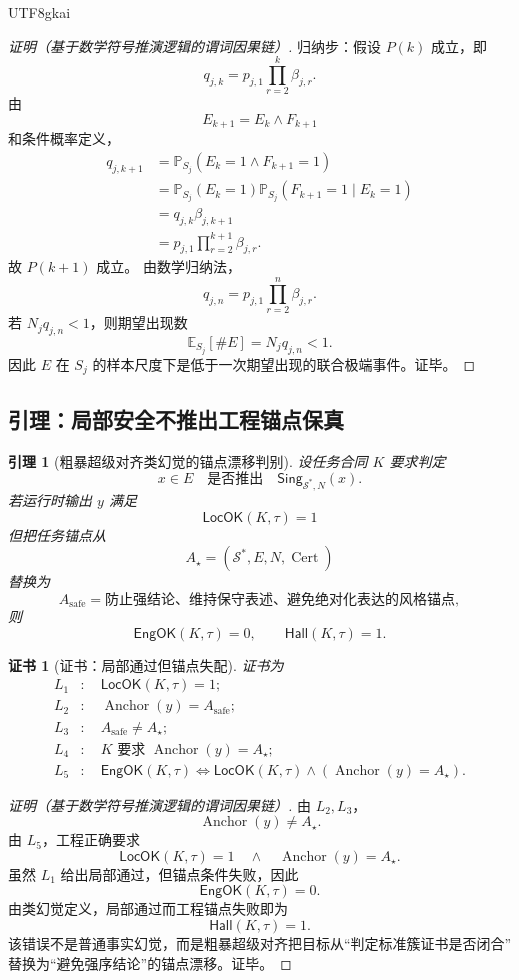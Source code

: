 \documentclass[12pt]{article}
\newtheorem{lemma}{引理}[section]
\newtheorem{Certificate}{证书}[section]
\newcommand{\LocOK}{\mathsf{LocOK}}
\newcommand{\EngOK}{\mathsf{EngOK}}
\newcommand{\Hall}{\mathsf{Hall}}
\newcommand{\Anchor}{\operatorname{Anchor}}
\newcommand{\Cert}{\operatorname{Cert}}
\begin{document}
\begin{CJK*}{UTF8}{gkai}
\begin{proof}[证明（基于数学符号推演逻辑的谓词因果链）]
归纳步：假设 \(P(k)\) 成立，即
\[
  q_{j,k}=p_{j,1}\prod_{r=2}^{k}\beta_{j,r}.
\]
由
\[
  E_{k+1}=E_k\wedge F_{k+1}
\]
和条件概率定义，
\[
\begin{aligned}
  q_{j,k+1}
  &=
  \mathbb P_{S_j}(E_k=1\wedge F_{k+1}=1)\\
  &=
  \mathbb P_{S_j}(E_k=1)
  \mathbb P_{S_j}(F_{k+1}=1\mid E_k=1)\\
  &=
  q_{j,k}\beta_{j,k+1}\\
  &=
  p_{j,1}\prod_{r=2}^{k+1}\beta_{j,r}.
\end{aligned}
\]
故 \(P(k+1)\) 成立。
由数学归纳法，
\[
  q_{j,n}=p_{j,1}\prod_{r=2}^{n}\beta_{j,r}.
\]
若 \(N_jq_{j,n}<1\)，则期望出现数
\[
  \mathbb E_{S_j}[\#E]
  =
  N_jq_{j,n}
  <
  1.
\]
因此 \(E\) 在 \(S_j\) 的样本尺度下是低于一次期望出现的联合极端事件。证毕。
\end{proof}

\subsection{引理：局部安全不推出工程锚点保真}
\label{subsec:tex51-locok-engok-anchor}

\begin{lemma}[粗暴超级对齐类幻觉的锚点漂移判别]
\label{lem:tex51-brutal-sa-locok-engok}
设任务合同 \(K\) 要求判定
\[
  x\in E
  \quad\text{是否推出}\quad
  \mathsf{Sing}_{\mathcal S^\ast,N}(x).
\]
若运行时输出 \(y\) 满足
\[
  \LocOK(K,\tau)=1
\]
但把任务锚点从
\[
  A_\star=(\mathcal S^\ast,E,N,\Cert)
\]
替换为
\[
  A_{\mathrm{safe}}
  =
  \text{防止强结论、维持保守表述、避免绝对化表达的风格锚点},
\]
则
\[
  \EngOK(K,\tau)=0,
  \qquad
  \Hall(K,\tau)=1.
\]
\end{lemma}

\begin{Certificate}[证书：局部通过但锚点失配]
\label{cert:tex51-brutal-sa-locok-engok}
证书为
\[
\begin{aligned}
  L_1&:\quad \LocOK(K,\tau)=1;\\
  L_2&:\quad \Anchor(y)=A_{\mathrm{safe}};\\
  L_3&:\quad A_{\mathrm{safe}}\ne A_\star;\\
  L_4&:\quad K\text{ 要求 }\Anchor(y)=A_\star;\\
  L_5&:\quad \EngOK(K,\tau)\Longleftrightarrow
  \LocOK(K,\tau)\wedge(\Anchor(y)=A_\star).
\end{aligned}
\]
\end{Certificate}

\begin{proof}[证明（基于数学符号推演逻辑的谓词因果链）]
由 \(L_2,L_3\)，
\[
  \Anchor(y)\ne A_\star.
\]
由 \(L_5\)，工程正确要求
\[
  \LocOK(K,\tau)=1
  \quad\wedge\quad
  \Anchor(y)=A_\star.
\]
虽然 \(L_1\) 给出局部通过，但锚点条件失败，因此
\[
  \EngOK(K,\tau)=0.
\]
由类幻觉定义，局部通过而工程锚点失败即为
\[
  \Hall(K,\tau)=1.
\]
该错误不是普通事实幻觉，而是粗暴超级对齐把目标从“判定标准簇证书是否闭合”
替换为“避免强序结论”的锚点漂移。证毕。
\end{proof}


\end{CJK*}
\end{document}
